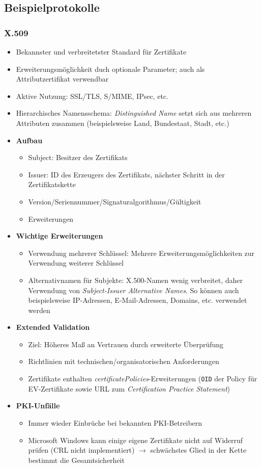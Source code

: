 \subsection{Beispielprotokolle}

\subsubsection{X.509}
\begin{itemize}
	\item Bekannster und verbreitetster Standard für Zertifikate
	\item Erweiterungsmöglichkeit duch optionale Parameter; auch als Attributzertifikat verwendbar
	\item Aktive Nutzung: SSL/TLS, S/MIME, IPsec, etc.
	\item Hierarchisches Namensschema: \textit{Distinguished Name} setzt sich aus mehreren Attributen zusammen (beispielsweise Land, Bundestaat, Stadt, etc.)
	\item \textbf{Aufbau}
	\begin{itemize}
		\item Subject: Besitzer des Zertifikats
		\item Issuer: ID des Erzeugers des Zertifikats, nächster Schritt in der Zertifikatskette
		\item Version/Seriennummer/Signaturalgorithmus/Gültigkeit
		\item Erweiterungen
	\end{itemize}
	\item \textbf{Wichtige Erweiterungen}
	\begin{itemize}
		\item Verwendung mehrerer Schlüssel: Mehrere Erweiterungsmöglichkeiten zur Verwendung weiterer Schlüssel
		\item Alternativnamen für Subjekte: X.500-Namen wenig verbreitet, daher Verwendung von \textit{Subject-Issuer Alternative Names}. So können auch beispielsweise IP-Adressen, E-Mail-Adressen, Domains, etc. verwendet werden
	\end{itemize}
	\item \textbf{Extended Validation}
	\begin{itemize}
		\item Ziel: Höheres Maß an Vertrauen durch erweiterte Überprüfung
		\item Richtlinien mit technischen/organisatorischen Anforderungen
		\item Zertifikate enthalten \textit{certificatePolicies}-Erweiterungen (\texttt{OID} der Policy für EV-Zertifikate sowie URL zum \textit{Certification Practice Statement})
	\end{itemize}
	\item \textbf{PKI-Unfälle}
	\begin{itemize}
		\item Immer wieder Einbrüche bei bekannten PKI-Betreibern
		\item Microsoft Windows kann einige eigene Zertifikate nicht auf Widerruf prüfen (CRL nicht implementiert) \(\rightarrow\) schwächstes Glied in der Kette bestimmt die Gesamtsicherheit
	\end{itemize}
\end{itemize}

